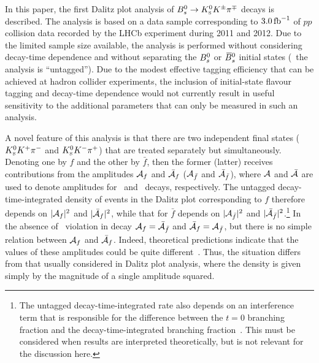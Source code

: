 In this paper, the first Dalitz plot analysis of ${{B}^0_{s}}\rightarrow{\ensuremath{{K}^0_{\mathrm{ \scriptscriptstyle S}}}}{\ensuremath{{K}^\pm}}{\ensuremath{{\pi}^\mp}}$ decays is described.  
The analysis is based on a data sample corresponding to $3.0\mbox{\,fb}^{-1}$ of $pp$ collision data recorded by the LHCb experiment during 2011 and 2012.
Due to the limited sample size available, the analysis is performed without considering decay-time dependence and without separating the ${{B}^0_{s}}$ or ${{\kern 0.18em\overline{\kern -0.18em B}{}}{}^0_{s}}$ initial states (\ie\ the analysis is ``untagged'').
Due to the modest effective tagging efficiency that can be achieved at hadron collider experiments, the inclusion of initial-state flavour tagging and decay-time dependence would not currently result in useful sensitivity to the additional parameters that can only be measured in such an analysis.

A novel feature of this analysis is that there are two independent final states (${{K}^0_{\mathrm{ \scriptscriptstyle S}}}{{K}^+}{{\pi}^-}$ and ${{K}^0_{\mathrm{ \scriptscriptstyle S}}}{{K}^-}{{\pi}^+}$) that are treated separately but simultaneously.
Denoting one by $f$ and the other by $\bar{f}$, then the former (latter) receives contributions from the amplitudes ${\cal{A}}_f$ and $\bar{\cal{A}}_f$ (${\cal{A}}_{\bar{f}}$ and $\bar{\cal{A}}_{\bar{f}}$), where ${\cal{A}}$ and $\bar{\cal{A}}$ are used to denote amplitudes for \Bs\ and \Bsb\ decays, respectively.
The untagged decay-time-integrated density of events in the Dalitz plot corresponding to $f$ therefore depends on $|{\cal A}_{f}|^2$ and $|\bar{{\cal A}}_{f}|^2$, while that for $\bar{f}$ depends on $|{\cal A}_{\bar{f}}|^2$ and $|\bar{{\cal A}}_{\bar{f}}|^2$.\footnote{
  The untagged decay-time-integrated rate also depends on an interference term that is responsible for the difference between the $t=0$ branching fraction and the decay-time-integrated branching fraction~\cite{DeBruyn:2012wj,LHCb-PAPER-2013-069,Dettori:2018bwt}.
  This must be considered when results are interpreted theoretically, but is not relevant for the discussion here.}
In the absence of \CP\ violation in decay ${\cal{A}}_f = {\bar{\cal{A}}}_{\bar{f}}$ and ${\bar{\cal{A}}}_f = {\cal{A}}_{\bar{f}}$, but there is no simple relation between ${\cal{A}}_f$ and ${\bar{\cal{A}}}_f$.
Indeed, theoretical predictions indicate that the values of these amplitudes could be quite different~\cite{Cheng:2014uga,Li:2014fla,Li:2018qrm}.
Thus, the situation differs from that usually considered in Dalitz plot analysis, where the density is given simply by the magnitude of a single amplitude squared. 


